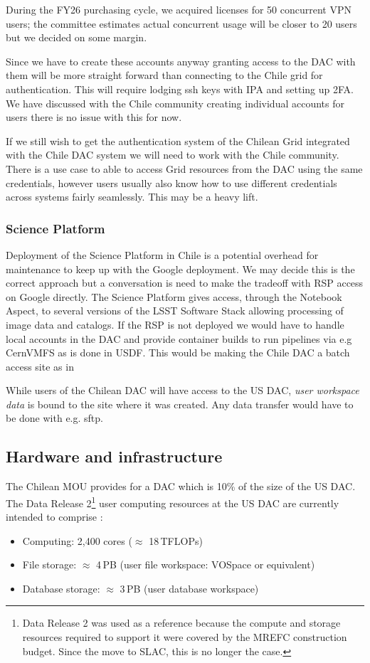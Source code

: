 During the FY26 purchasing cycle, we acquired licenses for 50 concurrent VPN users; the committee estimates actual concurrent usage will be closer to 20 users but we decided on some margin.

Since we have to create these accounts anyway granting access to the DAC with them will be more straight forward than
connecting to the Chile grid for authentication.
This will require lodging ssh keys with IPA and setting up 2FA.
We have discussed with the Chile community creating individual accounts for users there is no issue with this for now.

If we still wish to get the authentication system of the Chilean Grid integrated with the Chile DAC system 
we will need to work with the Chile community.
There is a use case to  able to access Grid resources from the DAC using the same credentials, however users usually also know
how to use different credentials across systems fairly seamlessly.
This may be a heavy lift.

\subsubsection{Science Platform}
Deployment of the Science Platform in Chile is a potential overhead for maintenance to keep up with the Google deployment.
We may decide this is the correct approach but a conversation is need to make the tradeoff with RSP access on Google directly.
The Science Platform gives access, through the Notebook Aspect, to several versions of the LSST Software Stack allowing processing of image data and catalogs.
If the RSP is not deployed we would  have to handle local accounts in the DAC and provide container builds to run pipelines via e.g CernVMFS as is done in USDF.
This would be making the Chile DAC a batch access site as in 

While users of the Chilean DAC will have access to the US DAC, \emph{user workspace data} is bound to the site where it was created.
Any data transfer would have to be done with e.g.  sftp.





\subsection{Hardware and infrastructure}\label{sec:hw}

The Chilean MOU provides for a DAC which is 10\% of the size of the US DAC.
The Data Release 2\footnote{Data Release 2 was used as a reference because the compute and storage resources required to support it were covered by the MREFC construction budget. Since the move to SLAC, this is no longer the case.} user computing resources at the US DAC are currently intended to comprise :
\begin{itemize}
\item Computing: 2,400 cores ($\approx$ 18\,TFLOPs)
\item File storage: $\approx$ 4\,PB  (user file workspace: VOSpace or equivalent)
\item Database storage: $\approx$ 3\,PB (user database workspace)
\end{itemize}


